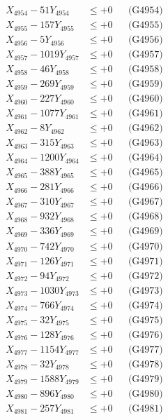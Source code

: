 \documentclass[a4paper,10pt]{article}
\begin{document}
{\begin{align}
X_{4954} - 51Y_{4954} &\leq +0 && \text{(G4954)} \\
X_{4955} - 157Y_{4955} &\leq +0 && \text{(G4955)} \\
X_{4956} - 5Y_{4956} &\leq +0 && \text{(G4956)} \\
X_{4957} - 1019Y_{4957} &\leq +0 && \text{(G4957)} \\
X_{4958} - 46Y_{4958} &\leq +0 && \text{(G4958)} \\
X_{4959} - 269Y_{4959} &\leq +0 && \text{(G4959)} \\
X_{4960} - 227Y_{4960} &\leq +0 && \text{(G4960)} \\
\allowbreak
X_{4961} - 1077Y_{4961} &\leq +0 && \text{(G4961)} \\
X_{4962} - 8Y_{4962} &\leq +0 && \text{(G4962)} \\
X_{4963} - 315Y_{4963} &\leq +0 && \text{(G4963)} \\
X_{4964} - 1200Y_{4964} &\leq +0 && \text{(G4964)} \\
X_{4965} - 388Y_{4965} &\leq +0 && \text{(G4965)} \\
X_{4966} - 281Y_{4966} &\leq +0 && \text{(G4966)} \\
X_{4967} - 310Y_{4967} &\leq +0 && \text{(G4967)} \\
X_{4968} - 932Y_{4968} &\leq +0 && \text{(G4968)} \\
X_{4969} - 336Y_{4969} &\leq +0 && \text{(G4969)} \\
X_{4970} - 742Y_{4970} &\leq +0 && \text{(G4970)} \\
\allowbreak
X_{4971} - 126Y_{4971} &\leq +0 && \text{(G4971)} \\
X_{4972} - 94Y_{4972} &\leq +0 && \text{(G4972)} \\
X_{4973} - 1030Y_{4973} &\leq +0 && \text{(G4973)} \\
X_{4974} - 766Y_{4974} &\leq +0 && \text{(G4974)} \\
X_{4975} - 32Y_{4975} &\leq +0 && \text{(G4975)} \\
X_{4976} - 128Y_{4976} &\leq +0 && \text{(G4976)} \\
X_{4977} - 1154Y_{4977} &\leq +0 && \text{(G4977)} \\
X_{4978} - 32Y_{4978} &\leq +0 && \text{(G4978)} \\
X_{4979} - 1588Y_{4979} &\leq +0 && \text{(G4979)} \\
X_{4980} - 896Y_{4980} &\leq +0 && \text{(G4980)} \\
\allowbreak
X_{4981} - 257Y_{4981} &\leq +0 && \text{(G4981)} \\

\end{align}}
\end{document}
